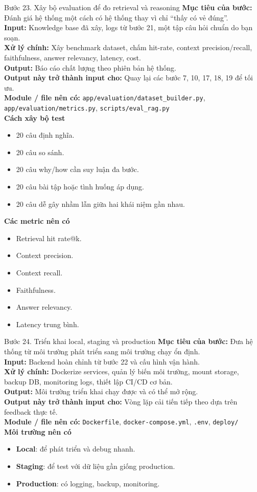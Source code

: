 \documentclass[12pt,a4paper]{article}
\newcommand{\stepgoal}[1]{\textbf{Mục tiêu của bước:} #1\\}
\newcommand{\stepinput}[1]{\textbf{Input:} #1\\}
\newcommand{\stepprocess}[1]{\textbf{Xử lý chính:} #1\\}
\newcommand{\stepoutput}[1]{\textbf{Output:} #1\\}
\newcommand{\stepnext}[1]{\textbf{Output này trở thành input cho:} #1\\}
\newcommand{\stepmodules}[1]{\textbf{Module / file nên có:} #1\\}
\begin{document}
\begin{stepbox}{Bước 23. Xây bộ evaluation để đo retrieval và reasoning}
\stepgoal{Đánh giá hệ thống một cách có hệ thống thay vì chỉ ``thấy có vẻ đúng''.}
\stepinput{Knowledge base đã xây, logs từ bước 21, một tập câu hỏi chuẩn do bạn soạn.}
\stepprocess{Xây benchmark dataset, chấm hit-rate, context precision/recall, faithfulness, answer relevancy, latency, cost.}
\stepoutput{Báo cáo chất lượng theo phiên bản hệ thống.}
\stepnext{Quay lại các bước 7, 10, 17, 18, 19 để tối ưu.}
\stepmodules{\texttt{app/evaluation/dataset\_builder.py}, \texttt{app/evaluation/metrics.py}, \texttt{scripts/eval\_rag.py}}

\textbf{Cách xây bộ test}
\begin{itemize}
    \item 20 câu định nghĩa.
    \item 20 câu so sánh.
    \item 20 câu why/how cần suy luận đa bước.
    \item 20 câu bài tập hoặc tình huống áp dụng.
    \item 20 câu dễ gây nhầm lẫn giữa hai khái niệm gần nhau.
\end{itemize}

\textbf{Các metric nên có}
\begin{itemize}
    \item Retrieval hit rate@k.
    \item Context precision.
    \item Context recall.
    \item Faithfulness.
    \item Answer relevancy.
    \item Latency trung bình.
\end{itemize}
\end{stepbox}

\begin{stepbox}{Bước 24. Triển khai local, staging và production}
\stepgoal{Đưa hệ thống từ môi trường phát triển sang môi trường chạy ổn định.}
\stepinput{Backend hoàn chỉnh từ bước 22 và cấu hình vận hành.}
\stepprocess{Dockerize services, quản lý biến môi trường, mount storage, backup DB, monitoring logs, thiết lập CI/CD cơ bản.}
\stepoutput{Môi trường triển khai chạy được và có thể mở rộng.}
\stepnext{Vòng lặp cải tiến tiếp theo dựa trên feedback thực tế.}
\stepmodules{\texttt{Dockerfile}, \texttt{docker-compose.yml}, \texttt{.env}, \texttt{deploy/}}

\textbf{Môi trường nên có}
\begin{itemize}
    \item \textbf{Local}: để phát triển và debug nhanh.
    \item \textbf{Staging}: để test với dữ liệu gần giống production.
    \item \textbf{Production}: có logging, backup, monitoring.
\end{itemize}
\end{stepbox}
\end{document}
